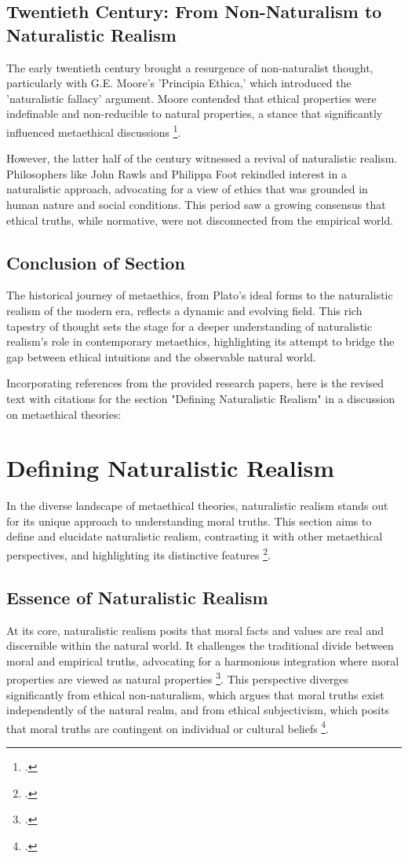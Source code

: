 \documentclass[12pt,a4paper]{article}
\begin{document}
\subsection{Twentieth Century: From Non-Naturalism to Naturalistic Realism}
The early twentieth century brought a resurgence of non-naturalist thought, particularly with G.E. Moore’s 'Principia Ethica,' which introduced the 'naturalistic fallacy' argument. Moore contended that ethical properties were indefinable and non-reducible to natural properties, a stance that significantly influenced metaethical discussions \footcite{Baldwin2006}. 

However, the latter half of the century witnessed a revival of naturalistic realism. Philosophers like John Rawls and Philippa Foot rekindled interest in a naturalistic approach, advocating for a view of ethics that was grounded in human nature and social conditions. This period saw a growing consensus that ethical truths, while normative, were not disconnected from the empirical world.

\subsection{Conclusion of Section}
The historical journey of metaethics, from Plato's ideal forms to the naturalistic realism of the modern era, reflects a dynamic and evolving field. This rich tapestry of thought sets the stage for a deeper understanding of naturalistic realism's role in contemporary metaethics, highlighting its attempt to bridge the gap between ethical intuitions and the observable natural world.

Incorporating references from the provided research papers, here is the revised text with citations for the section "Defining Naturalistic Realism" in a discussion on metaethical theories:

\section{Defining Naturalistic Realism}

In the diverse landscape of metaethical theories, naturalistic realism stands out for its unique approach to understanding moral truths. This section aims to define and elucidate naturalistic realism, contrasting it with other metaethical perspectives, and highlighting its distinctive features \footcite{Copp1991}.

\subsection{Essence of Naturalistic Realism}
At its core, naturalistic realism posits that moral facts and values are real and discernible within the natural world. It challenges the traditional divide between moral and empirical truths, advocating for a harmonious integration where moral properties are viewed as natural properties \footcite{Dreier2018}. This perspective diverges significantly from ethical non-naturalism, which argues that moral truths exist independently of the natural realm, and from ethical subjectivism, which posits that moral truths are contingent on individual or cultural beliefs \footcite{Joyce2014}.
\end{document}
